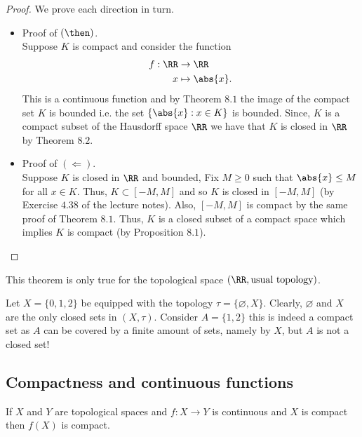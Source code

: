 \documentclass[12pt, a4paper]{article}
\begin{document}
\begin{proof}
    We prove each direction in turn.
    \begin{itemize}
        \item Proof of \((\then)\). \\
        Suppose \(K\) is compact and consider the function 
        \[\begin{aligned}
            f: \RR &\to \RR \\
            x &\mapsto \abs{x}.
        \end{aligned}\]
        This is a continuous function and by Theorem \(8.1\) the image of the compact set \(K\) is bounded i.e. the set \(\{\abs{x} : x \in K\}\) is bounded. Since, \(K\)  is a compact subset of the Hausdorff space \(\RR\) we have that \(K\) is closed in \(\RR\) by Theorem \(8.2\).
        \item Proof of \((\Leftarrow)\). \\
        Suppose \(K\) is closed in \(\RR\) and bounded, Fix \(M \geq 0\) such that \(\abs{x}\leq M\) for all \(x \in K\). Thus, \(K \subset [-M,M]\) and so \(K\) is closed in \([-M,M]\) (by Exercise \(4.38\) of the lecture notes). Also, \([-M,M]\) is compact by the same proof of Theorem \(8.1\). Thus, \(K\) is a closed subset of a compact space which implies \(K\) is compact (by Proposition \(8.1\)).
    \end{itemize}
\end{proof}

\begin{mdremark}
    This theorem is only true for the topological space \((\RR,\text{usual topology})\).
\end{mdremark}

\begin{mdexample}
    Let \(X = \{0,1,2\}\) be equipped with the topology \(\tau = \{\varnothing,X\}\). Clearly, \(\varnothing\) and \(X\) are the only closed sets in \((X,\tau)\). Consider \(A= \{1,2\}\) this is indeed a compact set as \(A\) can be covered by a finite amount of sets, namely by \(X\), but \(A\) is not a closed set!
\end{mdexample}

\subsection{Compactness and continuous functions}

\begin{mdthm}
    If \(X\) and \(Y\) are topological spaces and \(f:X\to Y\) is continuous and \(X\) is compact then \(f(X)\) is compact.
\end{mdthm}
\end{document}
